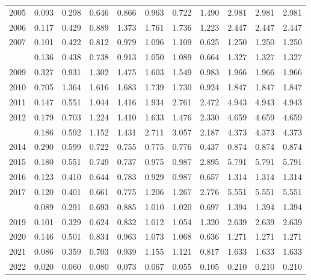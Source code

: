 \documentclass[
]{article}
\begin{document}
\begin{longtable}[t]{lrrrrrrrrrr}
2005 & 0.093 & 0.298 & 0.646 & 0.866 & 0.963 & 0.722 & 1.490 & 2.981 & 2.981 & 2.981\\
2006 & 0.117 & 0.429 & 0.889 & 1.373 & 1.761 & 1.736 & 1.223 & 2.447 & 2.447 & 2.447\\
2007 & 0.101 & 0.422 & 0.812 & 0.979 & 1.096 & 1.109 & 0.625 & 1.250 & 1.250 & 1.250\\
\addlinespace
2008 & 0.136 & 0.438 & 0.738 & 0.913 & 1.050 & 1.089 & 0.664 & 1.327 & 1.327 & 1.327\\
2009 & 0.327 & 0.931 & 1.302 & 1.475 & 1.603 & 1.549 & 0.983 & 1.966 & 1.966 & 1.966\\
2010 & 0.705 & 1.364 & 1.616 & 1.683 & 1.739 & 1.730 & 0.924 & 1.847 & 1.847 & 1.847\\
2011 & 0.147 & 0.551 & 1.044 & 1.416 & 1.934 & 2.761 & 2.472 & 4.943 & 4.943 & 4.943\\
2012 & 0.179 & 0.703 & 1.224 & 1.410 & 1.633 & 1.476 & 2.330 & 4.659 & 4.659 & 4.659\\
\addlinespace
2013 & 0.186 & 0.592 & 1.152 & 1.431 & 2.711 & 3.057 & 2.187 & 4.373 & 4.373 & 4.373\\
2014 & 0.290 & 0.599 & 0.722 & 0.755 & 0.775 & 0.776 & 0.437 & 0.874 & 0.874 & 0.874\\
2015 & 0.180 & 0.551 & 0.749 & 0.737 & 0.975 & 0.987 & 2.895 & 5.791 & 5.791 & 5.791\\
2016 & 0.123 & 0.410 & 0.644 & 0.783 & 0.929 & 0.987 & 0.657 & 1.314 & 1.314 & 1.314\\
2017 & 0.120 & 0.401 & 0.661 & 0.775 & 1.206 & 1.267 & 2.776 & 5.551 & 5.551 & 5.551\\
\addlinespace
2018 & 0.089 & 0.291 & 0.693 & 0.885 & 1.010 & 1.020 & 0.697 & 1.394 & 1.394 & 1.394\\
2019 & 0.101 & 0.329 & 0.624 & 0.832 & 1.012 & 1.054 & 1.320 & 2.639 & 2.639 & 2.639\\
2020 & 0.146 & 0.501 & 0.834 & 0.963 & 1.073 & 1.068 & 0.636 & 1.271 & 1.271 & 1.271\\
2021 & 0.086 & 0.359 & 0.703 & 0.939 & 1.155 & 1.121 & 0.817 & 1.633 & 1.633 & 1.633\\
2022 & 0.020 & 0.060 & 0.080 & 0.073 & 0.067 & 0.055 & 0.105 & 0.210 & 0.210 & 0.210\\*
\end{longtable}
\end{document}
